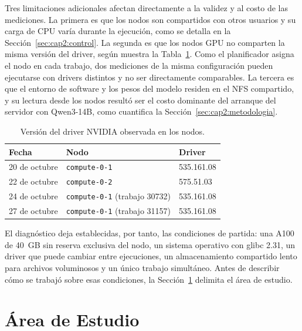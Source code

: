 Tres limitaciones adicionales afectan directamente a la validez y al costo de las mediciones. La primera es que los nodos son compartidos con otros usuarios y su carga de CPU varía durante la ejecución, como se detalla en la Sección~\ref{sec:cap2:control}. La segunda es que los nodos GPU no comparten la misma versión del driver, según muestra la Tabla~\ref{tab:cap2:driver}. Como el planificador asigna el nodo en cada trabajo, dos mediciones de la misma configuración pueden ejecutarse con drivers distintos y no ser directamente comparables. La tercera es que el entorno de software y los pesos del modelo residen en el NFS compartido, y su lectura desde los nodos resultó ser el costo dominante del arranque del servidor con Qwen3-14B, como cuantifica la Sección~\ref{sec:cap2:metodologia}.

\begin{table}[htbp]
  \centering
  \caption{Versión del driver NVIDIA observada en los nodos.}
  \label{tab:cap2:driver}
  \small
  \begin{tabular}{|p{}|p{}|p{}|}
    \hline
    \textbf{Fecha} & \textbf{Nodo} & \textbf{Driver} \\
    \hline
    20 de octubre & \texttt{compute-0-1} & 535.161.08 \\
    \hline
    22 de octubre & \texttt{compute-0-2} & 575.51.03 \\
    \hline
    24 de octubre & \texttt{compute-0-1} (trabajo 30732) & 535.161.08 \\
    \hline
    27 de octubre & \texttt{compute-0-1} (trabajo 31157) & 535.161.08 \\
    \hline
  \end{tabular}
\end{table}

El diagnóstico deja establecidas, por tanto, las condiciones de partida: una A100 de 40~GB sin reserva exclusiva del nodo, un sistema operativo con glibc 2.31, un driver que puede cambiar entre ejecuciones, un almacenamiento compartido lento para archivos voluminosos y un único trabajo simultáneo. Antes de describir cómo se trabajó sobre esas condiciones, la Sección~\ref{sec:cap2:area} delimita el área de estudio.

\section{Área de Estudio}
\label{sec:cap2:area}


